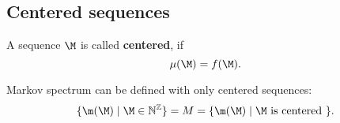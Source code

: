 \subsection{Centered sequences}

\begin{definition}
	A sequence $\M$ is called \textbf{centered}, if
	\begin{equation}\label{centered}
		\mu(\M) = f(\M).
	\end{equation}
\end{definition}

\begin{proposition}
	Markov spectrum can be defined with only centered sequences:
	\begin{equation*}
		\{ \m(\M) \mid \M \in \mathbb{N}^\mathbb{Z} \} =
		M =
		\{ \m(\M) \mid \M \text{ is centered } \}.
	\end{equation*}
\end{proposition}

